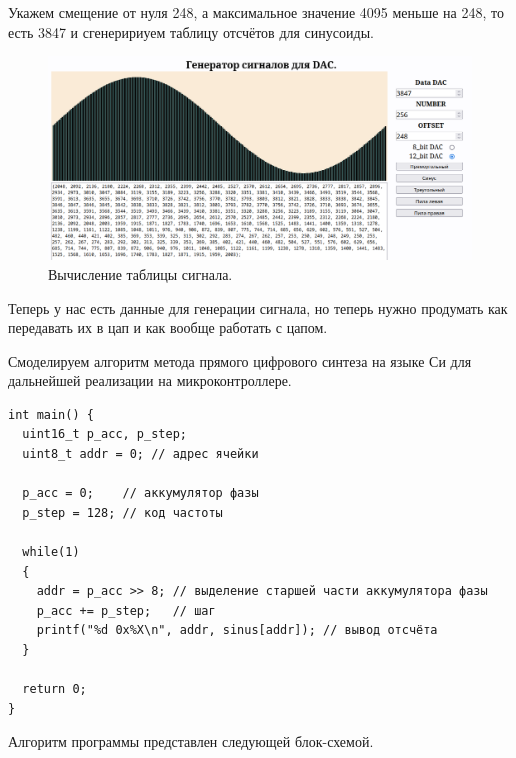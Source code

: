 	Укажем смещение от нуля 248, а максимальное значение 4095 меньше на 248, то есть 3847 и сгенеририуем таблицу отсчётов для синусоиды. 
	
	\begin{figure}[H]
    \centering
    \includegraphics[width=1\textwidth]{../image/lut.png}
    \caption{Вычисление таблицы сигнала.}
	\end{figure}
	
	Теперь у нас есть данные для генерации сигнала, но теперь нужно продумать как передавать их в цап и как вообще работать с цапом.

Смоделируем алгоритм метода прямого цифрового синтеза на языке Си для дальнейшей реализации на микроконтроллере.

\begin{code}
\begin{verbatim}
int main() {
  uint16_t p_acc, p_step;
  uint8_t addr = 0; // адрес ячейки

  p_acc = 0;    // аккумулятор фазы
  p_step = 128; // код частоты

  while(1)
  {
    addr = p_acc >> 8; // выделение старшей части аккумулятора фазы
    p_acc += p_step;   // шаг
    printf("%d 0x%X\n", addr, sinus[addr]); // вывод отсчёта
  }

  return 0;
}
\end{verbatim}
\end{code}

	Алгоритм программы представлен следующей блок-схемой.
	
